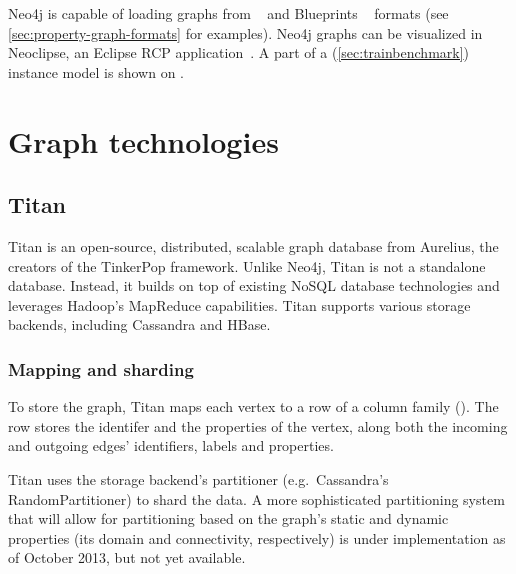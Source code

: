 Neo4j is capable of loading graphs from \graphml{}~\cite{GraphML} and Blueprints \graphson{}~\cite{BlueprintsGraphSON} formats (see \autoref{sec:property-graph-formats} for examples). Neo4j graphs can be visualized in Neoclipse, an Eclipse RCP application~\cite{Neoclipse}. A part of a \tb{} (\autoref{sec:trainbenchmark}) instance model is shown on .



\section{Graph technologies}

\subsection{Titan}
\label{subsec:titan}

Titan %
is an open-source, distributed, scalable graph database from Aurelius, the creators of the TinkerPop framework. Unlike Neo4j, Titan is not a standalone database. Instead, it builds on top of existing NoSQL database technologies and leverages Hadoop's MapReduce capabilities. Titan supports various storage backends, including Cassandra and HBase.


\subsubsection{Mapping and sharding}

To store the graph, Titan maps each vertex to a row of a column family (). The row stores the identifer and the properties of the vertex, along both the incoming and outgoing edges' identifiers, labels and properties.

Titan uses the storage backend's partitioner (e.g.\ Cassandra's RandomPartitioner) to shard the data. A more sophisticated partitioning system that will allow for partitioning based on the graph's static and dynamic properties (its domain and connectivity, respectively) is under implementation as of October 2013, but not yet available.


